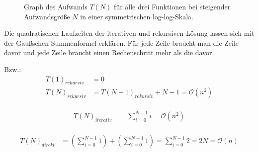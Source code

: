 \documentclass[paper=a4, fontsize=11pt]{scrartcl} %
\numberwithin{equation}{section} %
\numberwithin{figure}{section} %
\numberwithin{table}{section} %
\begin{document}
\begin{figure}[h]
  \centering
  \caption{Graph des Aufwands $T(N)$ f\"ur alle drei Funktionen bei steigender Aufwandsgr\"o{\ss}e $N$ in einer symmetrischen log-log-Skala.}
  \label{figure:loglogeq}
\end{figure}

Die quadratischen Laufzeiten der iterativen und rekursiven L\"osung lassen sich
mit der Gau{\ss}schen Summenformel erkl\"aren. F\"ur jede Zeile braucht man die
Zeile davor und jede Zeile braucht einen Rechenschritt mehr als die davor.

Bzw.:
\begin{equation}
  \begin{split}
    T(1)_{rekursiv} &= 0 \\
    T(N)_{rekursiv} &= T(N-1)_{rekursiv} + N - 1 = \mathcal{O}(n^2)\\
  \end{split}
\end{equation}

\begin{equation}
  \begin{split}
    T(N)_{iterativ} &= \sum_{i=0}^{N-1} i = \mathcal{O}(n^2)\\
  \end{split}
\end{equation}

\begin{equation}
  \begin{split}
    T(N)_{direkt} &= \left(\sum_{i=0}^{N-1} 1\right) + \left(\sum_{i=0}^{N-1} 1\right) = \sum_{i=0}^{N-1} 2 = 2N = \mathcal{O}(n)\\
  \end{split}
\end{equation}
\end{document}
